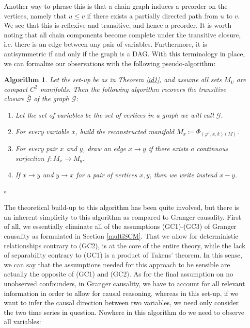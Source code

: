 \documentclass[11pt, a4paper]{memoir}
\theoremstyle{break}
\theoremstyle{break}
\newtheorem{inneralg}{Algorithm}
\newenvironment{alg}{\begin{inneralg}}{\ensuremath{\circ}\end{inneralg}}
\theoremstyle{nonumberplain}
\begin{document}
Another way to phrase this is that a chain graph induces a preorder on the vertices, namely that $u\leqslant v$ if there exists a partially directed path from $u$ to $v$. We see that this is reflexive and transitive, and hence a preorder. It is worth noting that all chain components become complete under the transitive closure, i.e. there is an edge between any pair of variables. Furthermore, it is antisymmetric if and only if the graph is a DAG. With this terminology in place, we can formalize our observations with the following pseudo-algorithm:
\begin{alg}
Let the set-up be as in Theorem \ref{id1}, and assume all sets $M_U$ are compact $C^2$ manifolds.  Then the following algorithm recovers the transitive closure $\overline{\mathcal{G}}$ of the graph $\mathcal{G}$:
\begin{enumerate}[label=\roman*.]
	\item Let the set of variables be the set of vertices in a graph we will call $\mathcal{G}$.
	\item For every variable $x$, build the reconstructed manifold $M_x\coloneqq \Phi	_{(\varphi^T,x,k)(M)}$.
	\item For every pair $x$ and $y$, draw an edge $x\to y$ if there exists a continuous surjection $f:M_x\to M_y$.
	\item If $x\to y$ and $y\to x$ for a pair of vertices $x,y$, then we write instead $x-y$.
\end{enumerate}
\end{alg}
The theoretical build-up to this algorithm has been quite involved, but there is an inherent simplicity to this algorithm as compared to Granger causality. First of all, we essentially eliminate all of the assumptions (GC1)-(GC3) of Granger causality as formulated in Section \ref{multiSCM}. That we allow for deterministic relationships contrary to (GC2), is at the core of the entire theory, while the lack of separability contrary to (GC1) is a product of Takens' theorem. In this sense, we can say that the assumptions needed for this approach to be sensible are actually the opposite of (GC1) and (GC2). As for the final assumption on no unobserved confounders, in Granger causality, we have to account for all relevant information in order to allow for causal reasoning, whereas in this set-up, if we want to infer the causal direction between two variables, we need only consider the two time series in question. Nowhere in this algorithm do we need to observe all variables:\\[5pt]
\end{document}

